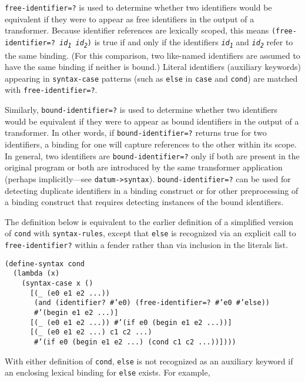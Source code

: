\texttt{free-identifier=?} is used to determine whether two
identifiers would be equivalent if they were to appear as free identifiers
in the output of a transformer.
Because identifier references are lexically scoped, this means
\texttt{(free-identifier=? \textit{id\textsubscript{1}} \textit{id\textsubscript{2}})} is true if and only if the
identifiers \texttt{\textit{id\textsubscript{1}}} and \texttt{\textit{id\textsubscript{2}}} refer to the same
binding.
(For this comparison, two like-named identifiers are assumed to have the
same binding if neither is bound.)
Literal identifiers (auxiliary keywords) appearing in
\texttt{syntax-case} patterns (such as \texttt{else} in \texttt{case}
and \texttt{cond})
are matched with \texttt{free-identifier=?}.

Similarly, \texttt{bound-identifier=?} is used to
determine whether two identifiers would be equivalent if they were to appear as
bound identifiers in the output of a transformer.
In other words, if \texttt{bound-identifier=?} returns true for two
identifiers, a binding for one will capture references to the
other within its scope.
In general, two identifiers are \texttt{bound-identifier=?} only if
both are present in the original program or both are introduced by the
same transformer application
(perhaps implicitly---see \texttt{datum-\textgreater{}syntax}).
\texttt{bound-identifier=?} can be used for detecting
duplicate identifiers in a binding construct or for other
preprocessing of a binding construct that requires detecting instances
of the bound identifiers.


The definition below is equivalent to the earlier definition
of a simplified version of \texttt{cond} with \texttt{syntax-rules}, except that
\texttt{else} is recognized via an explicit call to \texttt{free-identifier?} within
a fender rather than via inclusion in the literals list.


\begin{alltt}
(define-syntax cond
  (lambda (x)
    (syntax-case x ()
      [(\_{} (e0 e1 e2 ...))
       (and (identifier? \#{}'e0) (free-identifier=? \#{}'e0 \#{}'else))
       \#{}'(begin e1 e2 ...)]
      [(\_{} (e0 e1 e2 ...)) \#{}'(if e0 (begin e1 e2 ...))]
      [(\_{} (e0 e1 e2 ...) c1 c2 ...)
       \#{}'(if e0 (begin e1 e2 ...) (cond c1 c2 ...))])))
\end{alltt}


With either definition of \texttt{cond}, \texttt{else} is not
recognized as an auxiliary
keyword if an enclosing lexical binding for \texttt{else} exists.
For example,


